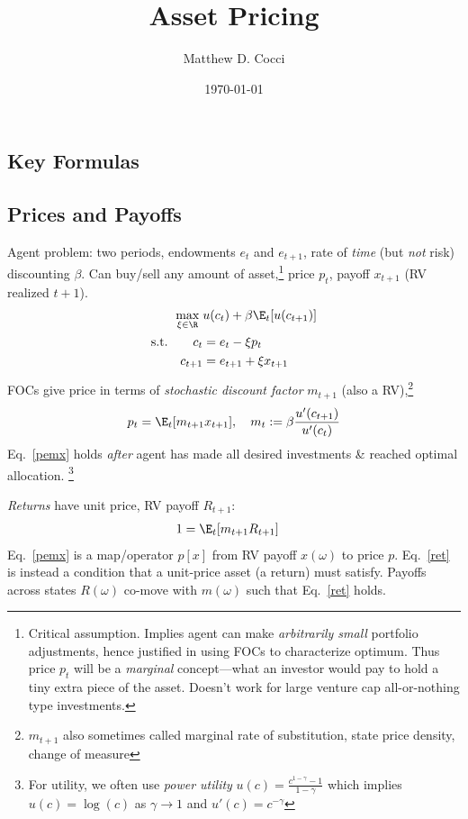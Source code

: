 \documentclass[12pt]{article}
\author{Matthew D. Cocci}
\title{Asset Pricing}
\date{\today}
\theoremstyle{plain}
\theoremstyle{definition}
\theoremstyle{remark}
\newcommand{\ra}{\rightarrow}
\begin{document}
\maketitle

\tableofcontents


\clearpage
\begin{multicols*}{2}
\section{Key Formulas}

\subsection{Prices and Payoffs}

Agent problem: two periods, endowments $e_t$ and $e_{t+1}$, rate
of \emph{time} (but \emph{not} risk) discounting $\beta$. Can buy/sell
any amount of asset,\footnote{
  Critical assumption.
  Implies agent can make \emph{arbitrarily small} portfolio adjustments,
  hence justified in using FOCs to characterize optimum.
  Thus price $p_t$ will be a \emph{marginal} concept---what an investor
  would pay to hold a tiny extra piece of the asset.
  Doesn't work for large venture cap all-or-nothing type investments.
}
price $p_t$, payoff $x_{t+1}$ (RV realized $t+1$).
\begin{align*}
  \max_{\xi\in\R}
  \;
  &u(c_t) + \beta\E_t[u(c_{t+1})] \\
  \text{s.t.}\qquad
  c_t &= e_t - \xi p_t \\
  c_{t+1} &= e_{t+1} + \xi x_{t+1}
\end{align*}
FOCs give price in terms of \emph{stochastic discount factor}
$m_{t+1}$ (also a RV),\footnote{%
  $m_{t+1}$ also sometimes called marginal rate of substitution, state
  price density, change of measure
}
\begin{align}
  p_t = \E_t[m_{t+1}x_{t+1}],
  \quad
  m_t := \beta \frac{u'(c_{t+1})}{u'(c_t)}
  \label{pemx}
\end{align}
Eq.~\ref{pemx} holds \emph{after} agent has made all
desired investments \& reached optimal allocation.
\footnote{%
  For utility, we often use \emph{power utility}
  $u(c) = \frac{c^{1-\gamma}-1}{1-\gamma}$
  which implies $u(c)=\log(c)$ as $\gamma\ra 1$ and
  $u'(c) = c^{-\gamma}$
}

\emph{Returns} have unit price, RV payoff $R_{t+1}$:
\begin{align}
  1 &= \E_t[m_{t+1}R_{t+1}]
  \label{ret}
\end{align}
Eq.~\ref{pemx} is a map/operator $p[x]$ from RV payoff $x(\omega)$ to
price $p$. Eq.~\ref{ret} is instead a condition that a unit-price asset
(a return) must satisfy.
Payoffs across states $R(\omega)$ co-move with $m(\omega)$
such that Eq.~\ref{ret} holds.


\end{multicols*}
\end{document}
